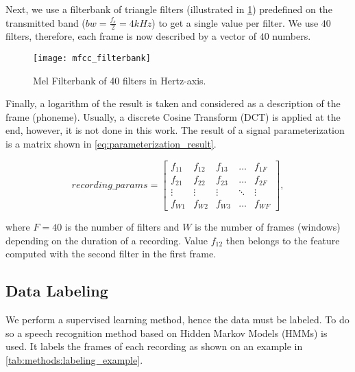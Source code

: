 \begin{enumerate}
Next, we use a filterbank of triangle filters (illustrated in \cref{fig:methods:mfcc_filterbank}) predefined on the transmitted band ($ bw = \frac{f_s}{2} = 4kHz $) to get a single value per filter. We use $ 40 $ filters, therefore, each frame is now described by a vector of $ 40 $ numbers.

\begin{figure}[H]
\centering
\texttt{[image: mfcc\_filterbank]}
\caption{Mel Filterbank of 40 filters in Hertz-axis.}
\label{fig:methods:mfcc_filterbank}
\end{figure}

Finally, a logarithm of the result is taken and considered as a description of the frame (phoneme). Usually, a discrete Cosine Transform (DCT) is applied at the end, however, it is not done in this work. The result of a signal parameterization is a matrix shown in \cref{eq:parameterization_result}.

\begin{equation} \label{eq:parameterization_result}
recording\_params = 
\begin{bmatrix}
    f_{11} & f_{12} & f_{13} & \dots  & f_{1F} \\
    f_{21} & f_{22} & f_{23} & \dots  & f_{2F} \\
    \vdots & \vdots & \vdots & \ddots & \vdots \\
    f_{W1} & f_{W2} & f_{W3} & \dots  & f_{WF}
\end{bmatrix}, 
\end{equation}

where $ F = 40 $ is the number of filters and $ W $ is the number of frames (windows) depending on the duration of a recording. Value $ f_{12} $ then belongs to the feature computed with the second filter in the first frame.
\end{enumerate}

\subsection*{Data Labeling}
We perform a supervised learning method, hence the data must be labeled. To do so a speech recognition method based on Hidden Markov Models (HMMs) is used. It labels the frames of each recording as shown on an example in \cref{tab:methods:labeling_example}.

